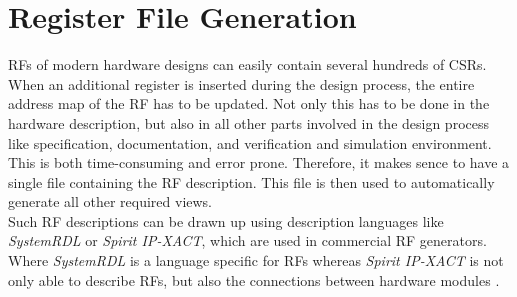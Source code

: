 \section{Register File Generation}
RFs of modern hardware designs can easily contain several hundreds of CSRs. When an additional register is inserted during the design process, the entire address map of the RF has to be updated. Not only this has to be done in the hardware description, but also in all other parts involved in the design process like specification, documentation, and verification and simulation environment. This is both time-consuming and error prone. Therefore, it makes sence to have a single file containing the RF description. This file is then used to automatically generate all other required views.\\

Such RF descriptions can be drawn up using description languages like \emph{SystemRDL} or \emph{Spirit IP-XACT}, which are used in commercial RF generators. Where \emph{SystemRDL} is a language specific for RFs \cite{system_rdl} whereas \emph{Spirit IP-XACT} is not only able to describe RFs, but also the connections between hardware modules \cite{ip_xact}.\\


